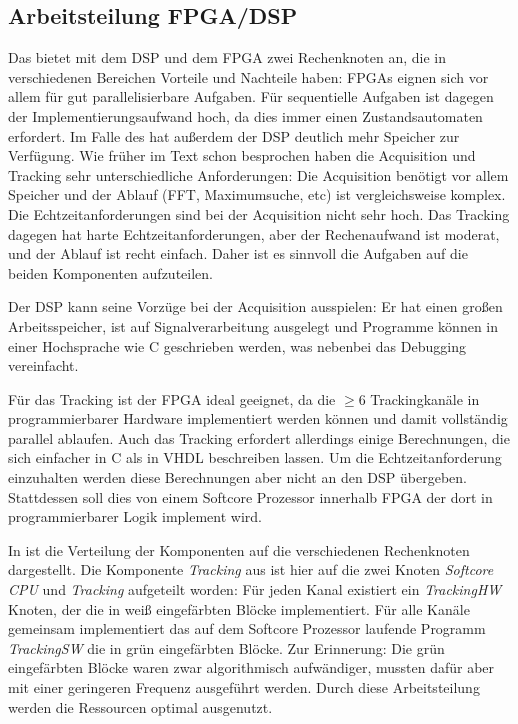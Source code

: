 \subsection{Arbeitsteilung FPGA/DSP}\label{ArbeitsteilungFPGADSP}
Das \comboard bietet mit dem DSP und dem FPGA zwei Rechenknoten an, die in verschiedenen Bereichen Vorteile und Nachteile haben: FPGAs eignen sich vor allem für gut parallelisierbare Aufgaben. Für sequentielle Aufgaben ist dagegen der Implementierungsaufwand hoch, da dies immer einen Zustandsautomaten erfordert. Im Falle des \comboard hat außerdem der DSP deutlich mehr Speicher zur Verfügung. Wie früher im Text schon besprochen haben die Acquisition und Tracking sehr unterschiedliche Anforderungen: Die Acquisition benötigt vor allem Speicher und der Ablauf (FFT, Maximumsuche, etc) ist vergleichsweise komplex. Die Echtzeitanforderungen sind bei der Acquisition nicht sehr hoch. Das Tracking dagegen hat harte Echtzeitanforderungen, aber der Rechenaufwand ist moderat, und der Ablauf ist recht einfach. Daher ist es sinnvoll die Aufgaben auf die beiden Komponenten aufzuteilen.

Der DSP kann seine Vorzüge bei der Acquisition ausspielen: Er hat einen großen Arbeitsspeicher, ist auf Signalverarbeitung ausgelegt und Programme können in einer Hochsprache wie C geschrieben werden, was nebenbei das Debugging vereinfacht.

Für das Tracking ist der FPGA ideal geeignet, da die $\geq 6$ Trackingkanäle in programmierbarer Hardware implementiert werden können und damit vollständig parallel ablaufen. Auch das Tracking erfordert allerdings einige Berechnungen, die sich einfacher in C als in VHDL beschreiben lassen. Um die Echtzeitanforderung einzuhalten werden diese Berechnungen aber nicht an den DSP übergeben. Stattdessen soll dies von einem Softcore Prozessor innerhalb FPGA der dort in programmierbarer Logik implement wird.

In  ist die Verteilung der Komponenten auf die verschiedenen Rechenknoten dargestellt. Die Komponente \emph{Tracking} aus  ist hier auf die zwei Knoten \emph{Softcore CPU} und \emph{Tracking} aufgeteilt worden: Für jeden Kanal existiert ein \emph{TrackingHW} Knoten, der die in  weiß eingefärbten Blöcke implementiert. Für alle Kanäle gemeinsam implementiert das auf dem Softcore Prozessor laufende Programm \emph{TrackingSW} die in  grün eingefärbten Blöcke. Zur Erinnerung: Die grün eingefärbten Blöcke waren zwar algorithmisch aufwändiger, mussten dafür aber mit einer geringeren Frequenz ausgeführt werden. Durch diese Arbeitsteilung werden die Ressourcen optimal ausgenutzt.

